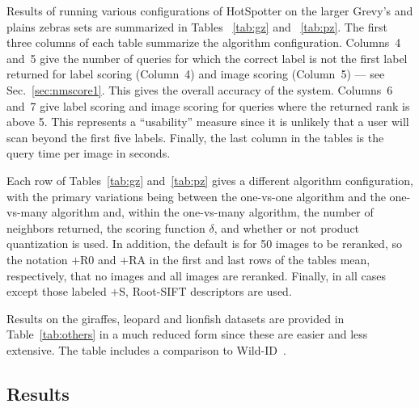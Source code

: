Results of running various configurations of HotSpotter on the larger
Grevy's and plains zebras sets are summarized in Tables ~\ref{tab:gz}
and ~\ref{tab:pz}. The first three columns of each table summarize the
algorithm configuration. Columns~4 and~5 give the number of queries
for which the correct label is not the first label returned for label
scoring (Column~4) and image scoring (Column~5) --- see
Sec.~\ref{sec:nmscore1}. This gives the overall accuracy of the
system.  Columns~6 and~7 give label scoring and image scoring for
queries where the returned rank is above 5.  This represents a
``usability'' measure since it is unlikely that a user will scan
beyond the first five labels.  Finally, the last column in the tables
is the query time per image in seconds.

Each row of Tables~\ref{tab:gz} and~\ref{tab:pz} gives a different
algorithm configuration, with the primary variations being between the
one-vs-one algorithm and the one-vs-many algorithm and, within the
one-vs-many algorithm, the number of neighbors returned, the scoring
function $\delta$, and whether or not product quantization is used.  In
addition, the default is for 50 images to be reranked, so the notation
$+$R0 and $+$RA in the first and last rows of the tables mean,
respectively, that no images and all images are reranked.  Finally, in all cases except those labeled $+$S,
Root-SIFT descriptors are used.

Results on the giraffes, leopard and lionfish datasets are provided in
Table~\ref{tab:others} in a much reduced form since these are easier
and less extensive.  The table includes a comparison to
Wild-ID~\cite{11BoldgerWILDID}.

\subsection{Results} \label{sec:results}

